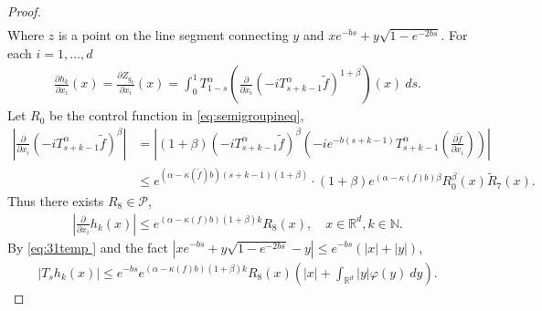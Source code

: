 \documentclass[12pt, a4paper]{amsart}
\theoremstyle{definition}
\numberwithin{equation}{section}
\begin{document}
\begin{proof}
\begin{align}
  \end{align}
 Where $z$ is a point on the line segment connecting $y$ and $xe^{-bs}+y\sqrt{1-e^{-2bs}}$. For each $i=1,...,d$
 \begin{align}
     \frac{\partial h_k}{\partial x_i}(x)=\frac{\partial Z_{g_k}}{\partial x_i}(x)=\int_0^1 T^{\alpha}_{1-s}\left(\frac{\partial}{\partial x_i}(-i T_{s+k-1}^{\alpha} \tilde{f})^{1+\beta}\right)(x)~ds.
 \end{align}
  Let $R_0$ be the control function in \eqref{eq:semigroupineq},
      \begin{align}
        \left|\frac{\partial}{\partial x_i}(-i T_{s+k-1}^{\alpha}\tilde{f})^{\beta}\right|&=\left|(1+\beta)(-i T_{s+k-1}^{\alpha}\tilde{f})^{\beta}(-i e^{-b(s+k-1)}T_{s+k-1}^{\alpha}\left(\frac{\partial \tilde{f}}{\partial x_i}\right))\right|\\
        &\leq e^{(\alpha-\kappa(\tilde{f})b)(s+k-1)(1+\beta)}\cdot (1+\beta)e^{(\alpha-\kappa(f)b)\beta}R_0^{\beta}(x)\tilde{R}_7(x).
    \end{align}
Thus there exists $R_8\in \mathcal{P}$,
\begin{align}
\label{eq:31temp }
    \left|\frac{\partial}{\partial x_i}h_k(x)\right|\leq e^{(\alpha-\kappa(f)b)(1+\beta)k}R_8(x),\quad x\in \mathbb{R}^d, k\in \mathbb{N}.
\end{align}
By \eqref{eq:31temp } and the fact $|xe^{-bs}+y\sqrt{1-e^{-2bs}}-y|\leq e^{-bs}(|x|+|y|)$,
\begin{align}
    |T_s h_k(x)|\leq e^{-bs}e^{(\alpha-\kappa(f)b)(1+\beta)k}R_8(x)(|x|+\int_{\mathbb{R}^d}|y|\varphi(y)~dy).
\end{align}


\end{proof}
\end{document}
